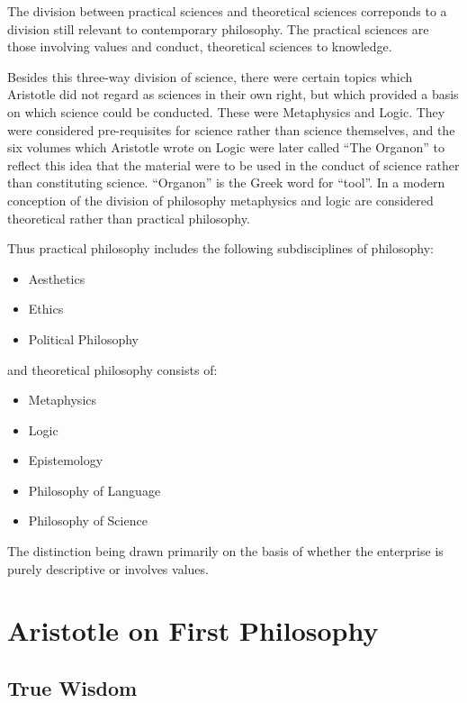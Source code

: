 \documentclass[10pt,titlepage]{article}
\begin{document}
The division between practical sciences and theoretical sciences correponds to a division still relevant to contemporary philosophy.
The practical sciences are those involving values and conduct, theoretical sciences to knowledge.

Besides this three-way division of science, there were certain topics which Aristotle did not regard as sciences in their own right, but which provided a basis on which science could be conducted.
These were Metaphysics and Logic.
They were considered pre-requisites for science rather than science themselves, and the six volumes which Aristotle wrote on Logic were later called ``The Organon'' to reflect this idea that the material were to be used in the conduct of science rather than constituting science.
``Organon'' is the Greek word for ``tool''.
In a modern conception of the division of philosophy metaphysics and logic are considered theoretical rather than practical philosophy.

Thus practical philosophy includes the following subdisciplines of philosophy:

\begin{itemize}
\item Aesthetics
\item Ethics
\item Political Philosophy
\end{itemize}

and theoretical philosophy consists of:

\begin{itemize}
\item Metaphysics
\item Logic
\item Epistemology
\item Philosophy of Language
\item Philosophy of Science
\end{itemize}

The distinction being drawn primarily on the basis of whether the enterprise is purely descriptive or involves values.

\section{Aristotle on First Philosophy}

\subsection{True Wisdom}
\end{document}
